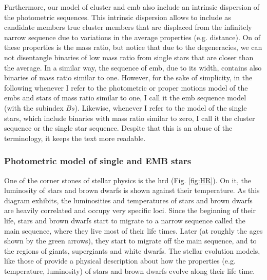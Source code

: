 Furthermore, our model of cluster and \gls{emb} also include an intrinsic dispersion of the photometric sequences. This intrinsic dispersion allows to include as candidate members true cluster members that are displaced from the infinitely narrow sequence due to variations in the average properties (e.g. distance). On of these properties is the mass ratio, but notice that due to the degeneracies, we can not disentangle binaries of low mass ratio from single stars that are closer than the average. In a similar way, the sequence of \gls{emb}, due to its width, contains also binaries of mass ratio similar to one. However, for the sake of simplicity, in the following whenever I refer to the photometric or proper motions model of the \glspl{emb} and stars of mass ratio similar to one, I call it the \gls{emb} sequence model (with the subindex $Bs$). Likewise, whenever I refer to the model of the single stars, which include binaries with mass ratio similar to zero, I call it the cluster sequence or the single star sequence. Despite that this is an abuse of the terminology, it keeps the text more readable.

\subsubsection{Photometric model of single and EMB stars}
\label{sect:cluster_ph}

One of the corner stones of stellar physics is the \gls{hrd} (Fig. \ref{fig:HR}). On it, the luminosity of stars and brown dwarfs is shown against their temperature. As this diagram exhibits, the luminosities and temperatures of stars and brown dwarfs are heavily correlated and occupy very specific loci. Since the beginning of their life, stars and brown dwarfs start to migrate to a narrow sequence called the main sequence, where they live most of their life times. Later (at roughly the ages shown by the green arrows), they start to migrate off the main sequence, and to the regions of giants, supergiants and white dwarfs. The stellar evolution models, like those of \citet{1998A&A...337..403B,2013MmSAI..84.1053A,2014IAUS..299..271A} provide a physical description about how the properties (e.g. temperature, luminosity) of stars and brown dwarfs evolve along their life time.

